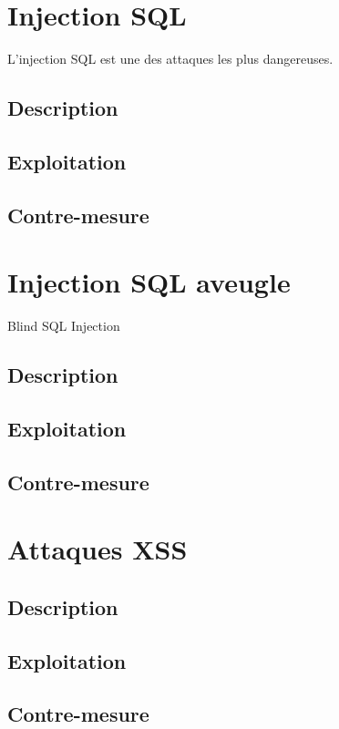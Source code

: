 
\newpage
\section{Injection SQL}
L'injection SQL est une des attaques les plus dangereuses.  

\subsection{Description}

\subsection{Exploitation}

\subsection{Contre-mesure}


\section{Injection SQL aveugle}
Blind SQL Injection 
\subsection{Description}

\subsection{Exploitation}

\subsection{Contre-mesure}


\section{Attaques XSS }

\subsection{Description}

\subsection{Exploitation}

\subsection{Contre-mesure}


